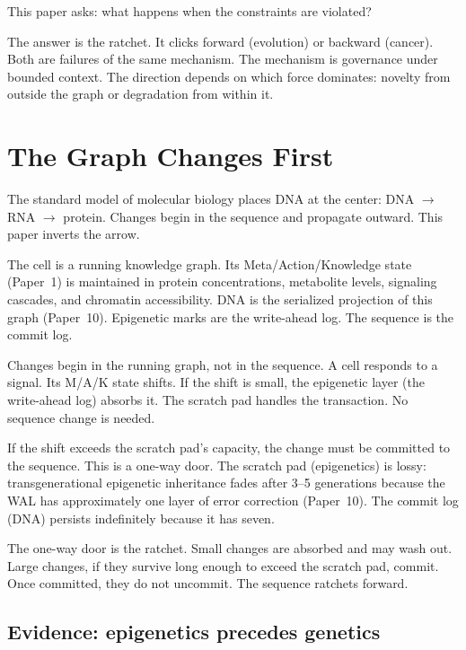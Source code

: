 \documentclass[11pt]{article}
\theoremstyle{definition}
\begin{document}
This paper asks: what happens when the constraints are violated?

The answer is the ratchet. It clicks forward (evolution) or backward
(cancer). Both are failures of the same mechanism. The mechanism is
governance under bounded context. The direction depends on which
force dominates: novelty from outside the graph or degradation from
within it.

\section{The Graph Changes First}
\label{sec:graph-first}

The standard model of molecular biology places DNA at the center:
DNA $\to$ RNA $\to$ protein. Changes begin in the sequence and
propagate outward. This paper inverts the arrow.

The cell is a running knowledge graph. Its Meta/Action/Knowledge
state (Paper~1) is maintained in protein concentrations, metabolite
levels, signaling cascades, and chromatin accessibility. DNA is the
serialized projection of this graph (Paper~10). Epigenetic marks are
the write-ahead log. The sequence is the commit log.

Changes begin in the running graph, not in the sequence. A cell
responds to a signal. Its M/A/K state shifts. If the shift is small,
the epigenetic layer (the write-ahead log) absorbs it. The scratch
pad handles the transaction. No sequence change is needed.

If the shift exceeds the scratch pad's capacity, the change must be
committed to the sequence. This is a one-way door. The scratch pad
(epigenetics) is lossy: transgenerational epigenetic inheritance fades
after 3--5 generations \cite{Heard2014} because the WAL has
approximately one layer of error correction (Paper~10). The commit log (DNA) persists
indefinitely because it has seven.

The one-way door is the ratchet. Small changes are absorbed and may
wash out. Large changes, if they survive long enough to exceed the
scratch pad, commit. Once committed, they do not uncommit. The
sequence ratchets forward.

\subsection{Evidence: epigenetics precedes genetics}
\end{document}

